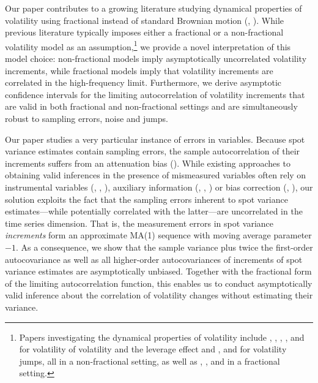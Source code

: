 \documentclass[ecta,nameyear,draft]{econsocart}
\newcommand{\1}{\mathbf 1}
\numberwithin{equation}{section}
\begin{document}
Our paper  contributes to a growing literature studying dynamical properties of volatility using fractional instead of standard Brownian motion  (\cite{CR96}, \cite{gatheral2018volatility}). While previous literature typically imposes either a fractional or a non-fractional volatility model as an assumption,\footnote{Papers investigating  the dynamical properties of volatility  include \cite{BR12}, \cite{AFL13, AFLWY17}, \cite{WM14}, \cite{KX17}, \cite{li2022volatility} and \cite{CT24} for  volatility of volatility and the leverage effect and \cite{jacod2010price}, \cite{todorov2011volatility} and \cite{BR16}  for  volatility jumps, all in a  non-fractional setting, as well as   \cite{bolko2023gmm}, \cite{chong2022CLT}, \cite{wang2023modeling} and \cite{chong2024nonparametric} in a fractional setting.} we provide a novel interpretation of this model choice:  non-fractional models imply asymptotically uncorrelated volatility increments, while fractional models imply that volatility increments are  correlated in the high-frequency limit. Furthermore, we  derive asymptotic confidence intervals for the limiting autocorrelation of volatility increments that are valid in both fractional and non-fractional settings and are simultaneously robust to sampling errors, noise and jumps.

Our paper studies a very particular instance of errors in variables. Because spot variance estimates contain sampling errors, the  sample autocorrelation of their increments suffers from an attenuation bias (\cite{H01}). While  existing approaches  to obtaining valid inferences in the presence of mismeasured variables  often rely on instrumental variables (\cite{HNIP91}, \cite{S07}, \cite{HS08}), auxiliary information (\cite{HNIP91}, \cite{S04}, \cite{CHT05}) or bias correction (\cite{C91}, \cite{EZ24}), our solution   exploits the fact that the sampling errors inherent to spot variance estimates---while potentially correlated with the latter---are  uncorrelated in the time series dimension. That is, the measurement errors in spot variance \emph{increments} form an approximate  MA(1) sequence with moving average parameter $-1$. As a consequence, we show that the sample variance plus twice the first-order autocovariance as well as all higher-order autocovariances of increments of spot variance estimates are asymptotically unbiased. Together with the fractional   form of the    limiting autocorrelation function, this enables us to conduct  asymptotically valid inference about the correlation of volatility changes without estimating their variance.
\end{document}
